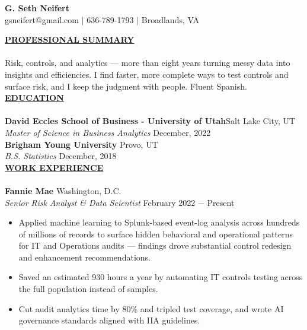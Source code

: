 \documentclass{article}
\begin{document}
\begin{center}
\large \textbf{G. Seth Neifert \\}
\normalsize gsneifert@gmail.com $\mid$ 636-789-1793 $\mid$ Broadlands, VA\\
\hrulefill
\end{center}

\noindent \textbf{\underline{PROFESSIONAL SUMMARY}} \\
\\
\noindent Risk, controls, and analytics --- more than eight years turning messy data into insights and efficiencies. I find faster, more complete ways to test controls and surface risk, and I keep the judgment with people. Fluent Spanish.
\\

\noindent \textbf{\underline{EDUCATION}} \\
\\
\textbf{David Eccles School of Business - University of Utah}\hfill Salt Lake City, UT \\
\textit{Master of Science in Business Analytics} \hfill December, 2022 \\
\textbf{Brigham Young University} \hfill Provo, UT \\
\textit{B.S. Statistics} \hfill December, 2018 \\

\noindent \textbf{\underline{WORK EXPERIENCE}} \\
\\
\noindent \textbf{Fannie Mae} \hfill Washington, D.C. \\
\textit{Senior Risk Analyst \& Data Scientist} \hfill February 2022 $-$ Present
\\
\begin{itemize}[noitemsep,nolistsep,leftmargin=*]
\item {Applied machine learning to Splunk-based event-log analysis across hundreds of millions of records to surface hidden behavioral and operational patterns for IT and Operations audits --- findings drove substantial control redesign and enhancement recommendations.}
\item {Saved an estimated 930 hours a year by automating IT controls testing across the full population instead of samples.}
\item {Cut audit analytics time by 80\% and tripled test coverage, and wrote AI governance standards aligned with IIA guidelines.}
\\
\end{itemize}
\end{document}
